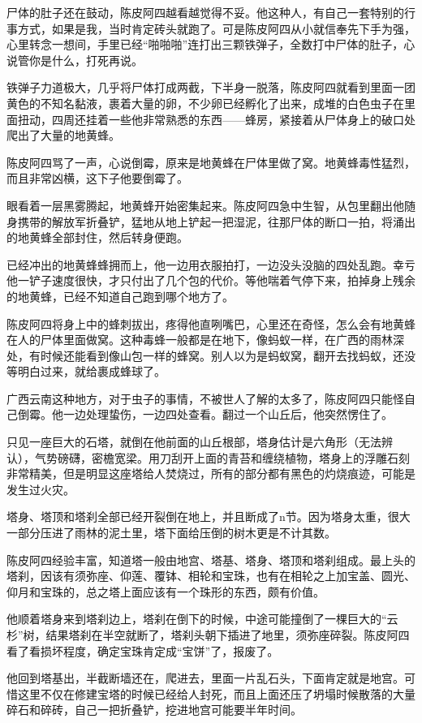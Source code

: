 尸体的肚子还在鼓动，陈皮阿四越看越觉得不妥。他这种人，有自己一套特别的行事方式，如果是我，当时肯定砖头就跑了。可是陈皮阿四从小就信奉先下手为强，心里转念一想间，手里已经“啪啪啪”连打出三颗铁弹子，全数打中尸体的肚子，心说管你是什么，打死再说。

铁弹子力道极大，几乎将尸体打成两截，下半身一脱落，陈皮阿四就看到里面一团黄色的不知名黏液，裹着大量的卵，不少卵已经孵化了出来，成堆的白色虫子在里面扭动，四周还挂着一些他非常熟悉的东西——蜂房，紧接着从尸体身上的破口处爬出了大量的地黄蜂。

陈皮阿四骂了一声，心说倒霉，原来是地黄蜂在尸体里做了窝。地黄蜂毒性猛烈，而且非常凶横，这下子他要倒霉了。

眼看着一层黑雾腾起，地黄蜂开始密集起来。陈皮阿四急中生智，从包里翻出他随身携带的解放军折叠铲，猛地从地上铲起一把湿泥，往那尸体的断口一拍，将涌出的地黄蜂全部封住，然后转身便跑。

已经冲出的地黄蜂蜂拥而上，他一边用衣服拍打，一边没头没脑的四处乱跑。幸亏他一铲子速度很快，才只付出了几个包的代价。等他喘着气停下来，拍掉身上残余的地黄蜂，已经不知道自己跑到哪个地方了。

陈皮阿四将身上中的蜂刺拔出，疼得他直咧嘴巴，心里还在奇怪，怎么会有地黄蜂在人的尸体里面做窝。这种毒蜂一般都是在地下，像蚂蚁一样，在广西的雨林深处，有时候还能看到像山包一样的蜂窝。别人以为是蚂蚁窝，翻开去找蚂蚁，还没等明白过来，就给裹成蜂球了。

广西云南这种地方，对于虫子的事情，不被世人了解的太多了，陈皮阿四只能怪自己倒霉。他一边处理蛰伤，一边四处查看。翻过一个山丘后，他突然愣住了。

只见一座巨大的石塔，就倒在他前面的山丘根部，塔身估计是六角形（无法辨认），气势磅礴，密檐宽梁。用刀刮开上面的青苔和缠绕植物，塔身上的浮雕石刻非常精美，但是明显这座塔给人焚烧过，所有的部分都有黑色的灼烧痕迹，可能是发生过火灾。

塔身、塔顶和塔刹全部已经开裂倒在地上，并且断成了n节。因为塔身太重，很大一部分压进了雨林的泥土里，塔下面给压倒的树木更是不计其数。

陈皮阿四经验丰富，知道塔一般由地宫、塔基、塔身、塔顶和塔刹组成。最上头的塔刹，因该有须弥座、仰莲、覆钵、相轮和宝珠，也有在相轮之上加宝盖、圆光、仰月和宝珠的，总之塔上面应该有一个珠形的东西，颇有价值。

他顺着塔身来到塔刹边上，塔刹在倒下的时候，中途可能撞倒了一棵巨大的“云杉”树，结果塔刹在半空就断了，塔刹头朝下插进了地里，须弥座碎裂。陈皮阿四看了看损坏程度，确定宝珠肯定成“宝饼”了，报废了。

他回到塔基出，半截断墙还在，爬进去，里面一片乱石头，下面肯定就是地宫。可惜这里不仅在修建宝塔的时候已经给人封死，而且上面还压了坍塌时候散落的大量碎石和碎砖，自己一把折叠铲，挖进地宫可能要半年时间。

